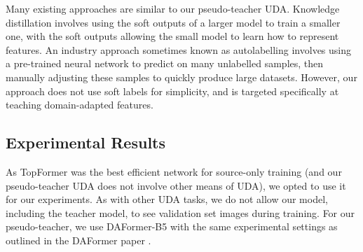 \documentclass[a4paper,12pt]{report}
\begin{document}
Many existing approaches are similar to our pseudo-teacher UDA. Knowledge distillation involves using the soft outputs of a larger model to train a smaller one, with the soft outputs allowing the small model to learn how to represent features. An industry approach sometimes known as autolabelling involves using a pre-trained neural network to predict on many unlabelled samples, then manually adjusting these samples to quickly produce large datasets. However, our approach does not use soft labels for simplicity, and is targeted specifically at teaching domain-adapted features.

\subsection{Experimental Results}
As TopFormer was the best efficient network for source-only training (and our pseudo-teacher UDA does not involve other means of UDA), we opted to use it for our experiments. As with other UDA tasks, we do not allow our model, including the teacher model, to see validation set images during training. For our pseudo-teacher, we use DAFormer-B5 with the same experimental settings as outlined in the DAFormer paper \cite{hoyer_daformer_2022}.

\begin{table}[h]
    \caption{Results of Pseudo-Teacher UDA on GTA \textrightarrow CS. All performance values are in \% mIoU}
\end{table}
\end{document}

